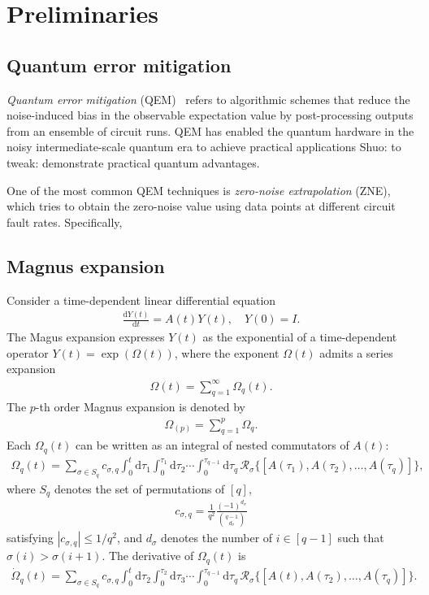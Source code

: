 \documentclass[11pt]{article}
\renewcommand{\d}{\mathrm{d}}
\newcommand{\mc}{\mathcal}
\newcommand{\sz}[1]{{\color{blue} Shuo: #1}}
\begin{document}
\section{Preliminaries}
\subsection{Quantum error mitigation}
\textit{Quantum error mitigation} (QEM)~\cite{cai2023quantum} refers to algorithmic schemes that reduce the noise-induced bias in the observable expectation value by post-processing outputs from an ensemble of circuit runs. QEM has enabled the quantum hardware in the noisy intermediate-scale quantum era to achieve practical applications \sz{to tweak: demonstrate practical quantum advantages}.

One of the most common QEM techniques is \textit{zero-noise extrapolation} (ZNE), which tries to obtain the zero-noise value using data points at different circuit fault rates. Specifically,

\subsection{Magnus expansion}
Consider a time-dependent linear differential equation \begin{align*}
    \frac{\d Y(t)}{\d t} = A(t) Y(t), \quad Y(0) = I.
\end{align*} The Magus expansion expresses $Y(t)$ as the exponential of a time-dependent operator $Y(t) = \exp(\Omega(t))$, where the exponent $\Omega(t)$ admits a series expansion \begin{align*}
    \Omega(t) = \sum_{q = 1}^{\infty} \Omega_q(t).
\end{align*} 
The $p$-th order Magnus expansion is denoted by \begin{align}
    \Omega_{(p)} = \sum_{q=1}^{p} \Omega_q. 
\end{align}
Each $\Omega_q(t)$ can be written as an integral of nested commutators of $A(t)$:
\begin{align}
\label{eq:magnus-formula}
    \Omega_q(t) = \sum_{\sigma\in S_q} c_{\sigma, q}  \int_{0}^t \d \tau_1 \int_{0}^{\tau_1}\d \tau_2 \cdots \int_{0}^{\tau_{q-1}}\d \tau_q \, \mc R_{\sigma}\big\{[A(\tau_1), A(\tau_2), \ldots, A(\tau_q)] \big\},
\end{align}
where $S_q$ denotes the set of permutations of $[q]$, \begin{align}
\label{eq:def-c-sigma}
    c_{\sigma, q}=\frac{1}{q^2}\frac{(-1)^{d_{\sigma}}}{\binom{q-1}{d_\sigma}} 
\end{align} satisfying $|c_{\sigma, q}|\le 1/q^2$, and $d_{\sigma}$ denotes the number of $i\in[q-1]$ such that $\sigma(i)>\sigma(i+1)$. The derivative of $\Omega_q(t)$ is
\begin{align}
    \dot{\Omega}_q(t) = \sum_{\sigma\in S_q} c_{\sigma, q}  \int_{0}^{t}\d \tau_2 \int_0^{\tau_2} \d\tau_3 \cdots \int_{0}^{\tau_{q-1}}\d \tau_q \, \mc R_{\sigma}\big\{[A(t), A(\tau_2), \ldots, A(\tau_q)] \big\}.
\end{align}
\end{document}
